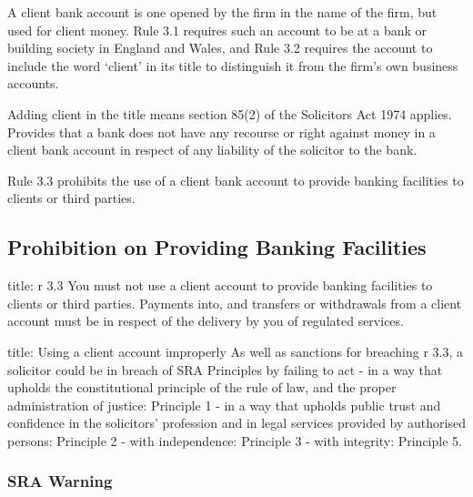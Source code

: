 \documentclass[
]{article}
\newenvironment{Shaded}{}{}
\newcommand{\NormalTok}[1]{#1}
\begin{document}
A client bank account is one opened by the firm in the name of the firm,
but used for client money. Rule 3.1 requires such an account to be at a
bank or building society in England and Wales, and Rule 3.2 requires the
account to include the word `client' in its title to distinguish it from
the firm's own business accounts.

Adding client in the title means section 85(2) of the Solicitors Act
1974 applies. Provides that a bank does not have any recourse or right
against money in a client bank account in respect of any liability of
the solicitor to the bank.

Rule 3.3 prohibits the use of a client bank account to provide banking
facilities to clients or third parties.

\hypertarget{prohibition-on-providing-banking-facilities}{%
\subsection{Prohibition on Providing Banking
Facilities}\label{prohibition-on-providing-banking-facilities}}

\begin{Shaded}
\begin{Highlighting}[]
\NormalTok{title: r 3.3}
\NormalTok{You must not use a client account to provide banking facilities to clients or third parties. Payments into, and transfers or withdrawals from a client account must be in respect of the delivery by you of regulated services.}
\end{Highlighting}
\end{Shaded}

\begin{Shaded}
\begin{Highlighting}[]
\NormalTok{title: Using a client account improperly}
\NormalTok{As well as sanctions for breaching r 3.3, a solicitor could be in breach of SRA Principles by failing to act }
\NormalTok{{-} in a way that upholds the constitutional principle of the rule of law, and the proper}
\NormalTok{administration of justice: Principle 1}
\NormalTok{{-} in a way that upholds public trust and confidence in the solicitors’ profession and in}
\NormalTok{legal services provided by authorised persons: Principle 2}
\NormalTok{{-} with independence: Principle 3}
\NormalTok{{-} with integrity: Principle 5.}
\end{Highlighting}
\end{Shaded}

\hypertarget{sra-warning}{%
\subsubsection{SRA Warning}\label{sra-warning}}
\end{document}
